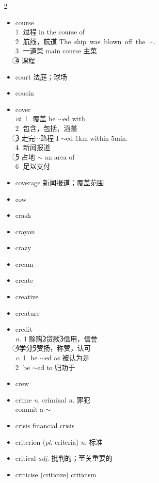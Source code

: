 \documentclass[../../book.tex]{subfiles}
\begin{document}
\begin{multicols}{2}
\begin{itemize}
\\discourage $\sim$ed $\sim$ing $\sim$ment
\item[-] course
\\\textcircled{1} 过程 in the course of
\\\textcircled{2} 航线，航道 \mbox{\small The ship was blown off the $\sim$.}
\\\textcircled{3} 一道菜 main course 主菜
\\\textcircled{4} 课程
\item[-] court 法庭；球场
\item[-] cousin
\item[-] cover
\\\emph{vt.} {\small\textcircled{1} 覆盖 be $\sim$ed with
\\\textcircled{2} 包含，包括，涵盖
\\\textcircled{3} 走完$\cdots$路程 I $\sim$ed 1km within 5min.
\\\textcircled{4} 新闻报道
\\\textcircled{5} 占地 $\sim$ an area of
\\\textcircled{6} 足以支付}
\item[-] coverage 新闻报道；覆盖范围
\item[-] cow
\item[-] crash
\item[-] crayon
\item[-] crazy
\item[-] cream
\item[-] create
\item[-] creative
\item[-] creature
\item[-] credit
\\\emph{n.} \textcircled{1}赊购\textcircled{2}贷款\textcircled{3}信用，信誉\\\textcircled{4}学分\textcircled{5}赞扬，称赞，认可
\\\emph{v.} \textcircled{1} be $\sim$ed as 被认为是\\\textcircled{2} be $\sim$ed to 归功于
\item[-] crew
\item[-] crime \emph{n.} \phantom{a} criminal \emph{n.} 罪犯
\\commit a $\sim$
\item[-] crisis \phantom{a} financial crisis
\item[-] criterion (\emph{pl.} criteria) \emph{n.} 标准
\item[-] critical \emph{adj.} 批判的；至关重要的
\item[-] criticise (criticize) \phantom{a} criticism

\end{itemize}
\end{multicols}
\end{document}
